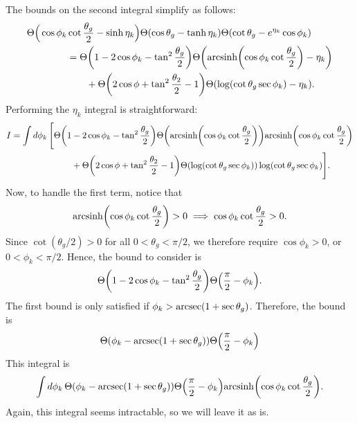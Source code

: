 \documentclass[11pt,twoside,reqno]{amsart}
\theoremstyle{plain}
\theoremstyle{remark}
\theoremstyle{definition}
\theoremstyle{remark}
\theoremstyle{definition}
\theoremstyle{definition}
\newcommand{\arcsinh}{\mathrm{arcsinh}}
\begin{document}
	The bounds on the second integral simplify as follows:
	\begin{equation}
	\begin{aligned}
		\Theta\Big(\cos\phi_k &\cot\frac{\theta_g}{2} - \sinh\eta_k\Big)\Theta(\cos\theta_g - \tanh\eta_k)\Theta(\cot\theta_g - e^{\eta_k}\cos\phi_k) \\
		&= \Theta\qty(1 - 2\cos\phi_k - \tan^2\frac{\theta_g}{2}) \Theta\qty(\arcsinh\qty(\cos\phi_k \cot\frac{\theta_g}{2}) - \eta_k) \\
			&\qquad+ \Theta\qty(2\cos\phi + \tan^2\frac{\theta_2}{2} - 1)\Theta\qty(\log(\cot\theta_g \sec\phi_k) - \eta_k).
	\end{aligned}
	\end{equation}
	Performing the $\eta_k$ integral is straightforward:
	\begin{equation}
	\begin{aligned}
		I = \int d\phi_k \, \Bigg[&\Theta\qty(1 - 2\cos\phi_k - \tan^2\frac{\theta_g}{2})\Theta\qty(\arcsinh\qty(\cos\phi_k \cot\frac{\theta_g}{2})) \arcsinh\qty(\cos\phi_k \cot\frac{\theta_g}{2}) \\
			&\qquad+ \Theta\qty(2\cos\phi + \tan^2\frac{\theta_2}{2} - 1)\Theta\qty(\log(\cot\theta_g \sec\phi_k))\log(\cot\theta_g \sec\phi_k) \Bigg].
	\end{aligned}
	\end{equation}
	Now, to handle the first term, notice that
	\begin{equation}
		\arcsinh\qty(\cos\phi_k \cot\frac{\theta_g}{2}) > 0 \implies \cos\phi_k \cot\frac{\theta_g}{2} > 0.
	\end{equation}
	Since $\cot(\theta_g/2) > 0$ for all $0 < \theta_g < \pi/2$, we therefore require $\cos\phi_k > 0$, or $0 < \phi_k < \pi/2$. Hence, the bound to consider is
	\begin{equation}
		\Theta\qty(1 - 2\cos\phi_k - \tan^2\frac{\theta_g}{2})\Theta\qty(\frac{\pi}{2} - \phi_k).
	\end{equation}
	The first bound is only satisfied if $\phi_k > \arcsec(1 + \sec\theta_g)$. Therefore, the bound is
	\begin{equation}
		\Theta\qty(\phi_k - \arcsec(1 + \sec\theta_g))\Theta\qty(\frac{\pi}{2} - \phi_k)
	\end{equation}
	This integral is
	\begin{equation}\label{eq:gluon second integral part 1}
		\int d\phi_k \, \Theta\qty(\phi_k - \arcsec(1 + \sec\theta_g))\Theta\qty(\frac{\pi}{2} - \phi_k) \arcsinh\qty(\cos\phi_k \cot\frac{\theta_g}{2}).
	\end{equation}
	Again, this integral seems intractable, so we will leave it as is.
\end{document}
